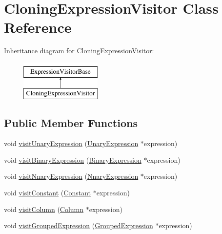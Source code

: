 \hypertarget{class_cloning_expression_visitor}{\section{Cloning\+Expression\+Visitor Class Reference}
\label{class_cloning_expression_visitor}
}
Inheritance diagram for Cloning\+Expression\+Visitor\+:\begin{figure}[H]
\begin{center}
\leavevmode
\includegraphics[height=2.000000cm]{class_cloning_expression_visitor}
\end{center}
\end{figure}
\subsection*{Public Member Functions}
\begin{DoxyCompactItemize}
\item 
void \hyperlink{class_cloning_expression_visitor_a5eef4362b38190ddadda4c3a6c530475}{visit\+Unary\+Expression} (\hyperlink{class_unary_expression}{Unary\+Expression} $\ast$expression)
\item 
void \hyperlink{class_cloning_expression_visitor_a6a7ba77a1e2b18837d5968d8c9c6e1bc}{visit\+Binary\+Expression} (\hyperlink{class_binary_expression}{Binary\+Expression} $\ast$expression)
\item 
void \hyperlink{class_cloning_expression_visitor_ac09c5ce926f720992e6799b39625fbc2}{visit\+Nnary\+Expression} (\hyperlink{class_nnary_expression}{Nnary\+Expression} $\ast$expression)
\item 
void \hyperlink{class_cloning_expression_visitor_af88937b26b66507f653a0370f51e2fa1}{visit\+Constant} (\hyperlink{class_constant}{Constant} $\ast$expression)
\item 
void \hyperlink{class_cloning_expression_visitor_aae3630ba345d058f2b1be2ae6c83340c}{visit\+Column} (\hyperlink{class_column}{Column} $\ast$expression)
\item 
void \hyperlink{class_cloning_expression_visitor_af5bd6b26028188a7a582a2236342e339}{visit\+Grouped\+Expression} (\hyperlink{class_grouped_expression}{Grouped\+Expression} $\ast$expression)
\end{DoxyCompactItemize}

